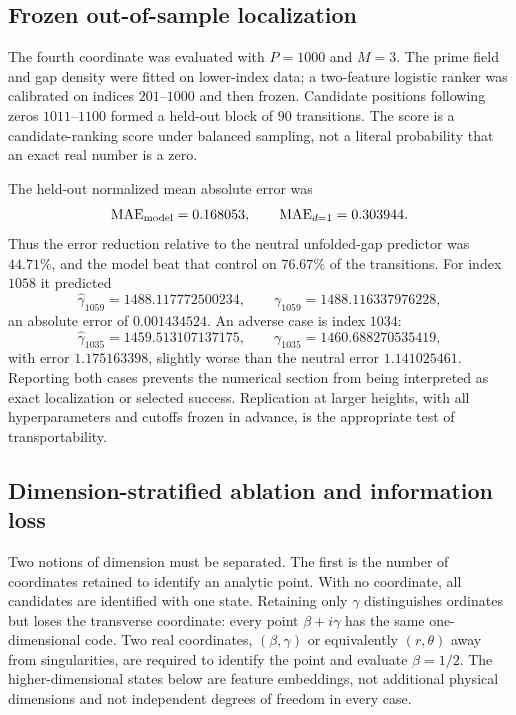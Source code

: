 \documentclass[11pt]{amsart}
\theoremstyle{definition}
\theoremstyle{remark}
\begin{document}
\subsection{Frozen out-of-sample localization}
The fourth coordinate was evaluated with $P=1000$ and $M=3$.  The prime field and gap
density were fitted on lower-index data; a two-feature logistic ranker was calibrated on
indices $201$--$1000$ and then frozen.  Candidate positions following zeros
$1011$--$1100$ formed a held-out block of $90$ transitions.  The score is a candidate-ranking
score under balanced sampling, not a literal probability that an exact real number is a zero.

The held-out normalized mean absolute error was
\begin{equation}\label{eq:predictMAE}
 \operatorname{MAE}_{\rm model}=0.168053,
 \qquad
 \operatorname{MAE}_{d=1}=0.303944.
\end{equation}
Thus the error reduction relative to the neutral unfolded-gap predictor was $44.71\%$, and the
model beat that control on $76.67\%$ of the transitions.  For index $1058$ it predicted
\[
 \widehat\gamma_{1059}=1488.117772500234,
 \qquad
 \gamma_{1059}=1488.116337976228,
\]
an absolute error of $0.001434524$.  An adverse case is index $1034$:
\[
 \widehat\gamma_{1035}=1459.513107137175,
 \qquad
 \gamma_{1035}=1460.688270535419,
\]
with error $1.175163398$, slightly worse than the neutral error $1.141025461$.  Reporting both
cases prevents the numerical section from being interpreted as exact localization or selected
success.  Replication at larger heights, with all hyperparameters and cutoffs frozen in advance,
is the appropriate test of transportability.

\subsection{Dimension-stratified ablation and information loss}\label{subsec:ablation}
Two notions of dimension must be separated.  The first is the number of coordinates retained
to identify an analytic point.  With no coordinate, all candidates are identified with one
state.  Retaining only $\gamma$ distinguishes ordinates but loses the transverse coordinate:
every point $\beta+i\gamma$ has the same one-dimensional code.  Two real coordinates,
$(\beta,\gamma)$ or equivalently $(r,\theta)$ away from singularities, are required to identify
the point and evaluate $\beta=1/2$.  The higher-dimensional states below are feature embeddings,
not additional physical dimensions and not independent degrees of freedom in every case.
\end{document}
